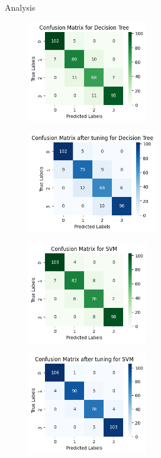 \documentclass[14pt, aspectratio=169]{beamer}
\begin{document}
\begin{frame}[allowframebreaks]{Analysis}
\begin{adjustwidth}{-0.75cm}{1.25cm}
\begin{figure}[H]
    \centering
		\begin{minipage}{0.45\textwidth}
			\centering
			\includegraphics[height=12em]{../report/cmat_DT.png}
			\label{cmat_DT}
		\end{minipage}
    \hfill
    \begin{minipage}{0.45\textwidth}
        \centering
        \includegraphics[height=12em]{../report/cmat_tuned_DT.png}
        \label{cmat_tuned_DT}
    \end{minipage}
\end{figure}
\begin{figure}[H]
    \centering
		\begin{minipage}{0.45\textwidth}
			\centering
			\includegraphics[height=12em]{../report/cmat_SVM.png}
			\label{cmat_SVM}
		\end{minipage}
    \hfill
    \begin{minipage}{0.45\textwidth}
        \centering
        \includegraphics[height=12em]{../report/cmat_tuned_SVM.png}

\end{minipage}
\end{figure}
\end{adjustwidth}
\end{frame}
\end{document}
